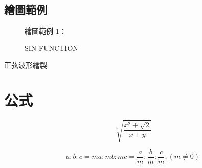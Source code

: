 \subsection{繪圖範例}
\begin{figure}[h]
繪圖範例 1： \\
   \centering
      \pgfplotsset{width=10cm}         %
   \caption{SIN FUNCTION}\label{fig:SIN FUNCTION}
\end{figure}
正弦波形繪製


\section{公式}
\begin{equation}
   \sqrt[n]{\frac{x^2+\sqrt 2}{x+y}}
\end{equation}

\begin{equation}
   a:b:c = ma : mb: mc = \frac{a}{m} : \frac{b}{m} : \frac{c}{m} , (m \neq 0)
\end{equation}

